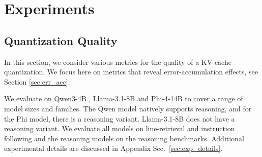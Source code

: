 \documentclass{llmxive}
\begin{document}





\section{Experiments}
\label{sec:exp}

\subsection{Quantization Quality}
\label{sec:quality}
In this section, we consider various metrics for the quality of a KV-cache quantization. We focus here on metrics that reveal error-accumulation effects, see Section \ref{sec:err_acc}. 

We evaluate on Qwen3-4B \cite{yang2025qwen3technicalreport}, Llama-3.1-8B \cite{grattafiori2024llama} and Phi-4-14B \cite{abdin2024phi} to cover a range of model sizes and families. The Qwen model natively supports reasoning, and for the Phi model, there is a reasoning variant. Llama-3.1-8B does not have a reasoning variant. We evaluate all models on line-retrieval and instruction following and the reasoning models on the reasoning benchmarks. Additional experimental details are discussed in Appendix Sec.~\ref{sec:exp_details}.

\end{document}
